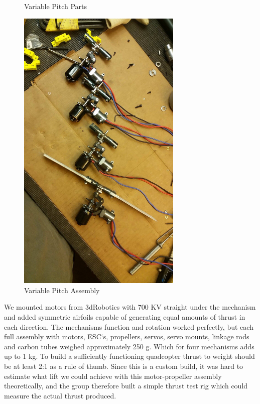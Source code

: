 \begin{figure}[h]
\begin{minipage}[b]{0.4\textwidth}
              \caption{Variable Pitch Parts}
            \label{fig:testpic2}
        \end{minipage}
        \hfill
        \begin{minipage}[b]{0.4\textwidth}
            \includegraphics[width = 0.7\textwidth]{VAPIQ-PICTURES/AfterAssemblyVPQ.jpg}
            \caption{Variable Pitch Assembly}
            \label{fig:testpic3}
        \end{minipage}
\end{figure}

We mounted motors from 3dRobotics with 700 KV straight under the mechanism and added symmetric airfoils capable of generating equal amounts of thrust in each direction. The mechanisms function and rotation worked perfectly, but each full assembly with motors, ESC`s, propellers, servos, servo mounts, linkage rods and carbon tubes weighed approximately 250 g. Which for four mechanisms adds up to 1 kg. To build a sufficiently functioning quadcopter thrust to weight should be at least 2:1 as a rule of thumb. Since this is a custom build, it was hard to estimate what lift we could achieve with this motor-propeller assembly theoretically, and the group therefore built a simple thrust test rig which could measure the actual thrust produced. 

